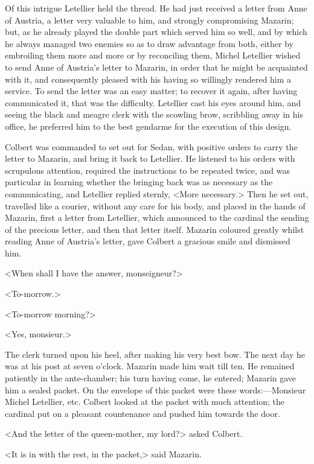 Of this intrigue Letellier held the thread. He had just received a letter from Anne of Austria, a letter very valuable to him, and strongly compromising Mazarin; but, as he already played the double part which served him so well, and by which he always managed two enemies so as to draw advantage from both, either by embroiling them more and more or by reconciling them, Michel Letellier wished to send Anne of Austria's letter to Mazarin, in order that he might be acquainted with it, and consequently pleased with his having so willingly rendered him a service. To send the letter was an easy matter; to recover it again, after having communicated it, that was the difficulty. Letellier cast his eyes around him, and seeing the black and meagre clerk with the scowling brow, scribbling away in his office, he preferred him to the best gendarme for the execution of this design.

Colbert was commanded to set out for Sedan, with positive orders to carry the letter to Mazarin, and bring it back to Letellier. He listened to his orders with scrupulous attention, required the instructions to be repeated twice, and was particular in learning whether the bringing back was as necessary as the communicating, and Letellier replied sternly, <More necessary.> Then he set out, travelled like a courier, without any care for his body, and placed in the hands of Mazarin, first a letter from Letellier, which announced to the cardinal the sending of the precious letter, and then that letter itself. Mazarin coloured greatly whilst reading Anne of Austria's letter, gave Colbert a gracious smile and dismissed him.

<When shall I have the answer, monseigneur?>

<To-morrow.>

<To-morrow morning?>

<Yes, monsieur.>

The clerk turned upon his heel, after making his very best bow. The next day he was at his post at seven o'clock. Mazarin made him wait till ten. He remained patiently in the ante-chamber; his turn having come, he entered; Mazarin gave him a sealed packet. On the envelope of this packet were these words:—Monsieur Michel Letellier, etc. Colbert looked at the packet with much attention; the cardinal put on a pleasant countenance and pushed him towards the door.

<And the letter of the queen-mother, my lord?> asked Colbert.

<It is in with the rest, in the packet,> said Mazarin.

